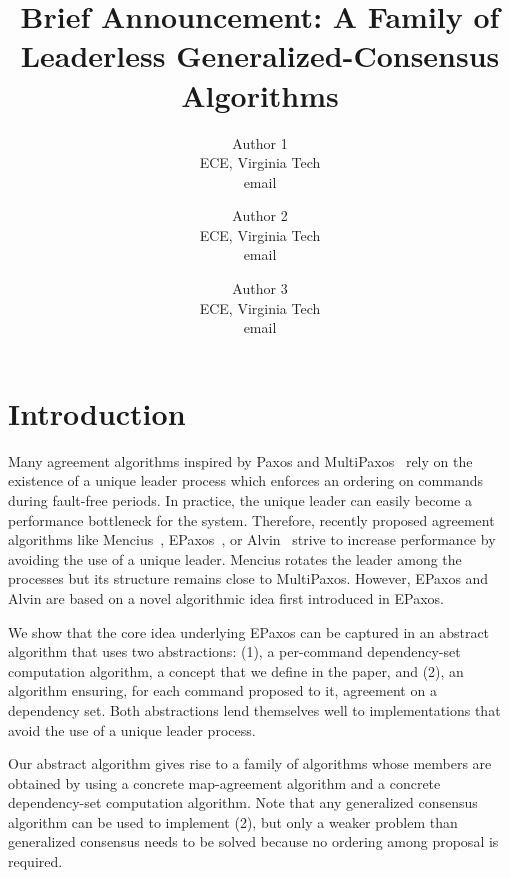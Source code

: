 

\title{\vspace{-0.8in}Brief Announcement: A Family of Leaderless Generalized-Consensus Algorithms}

\author{
Author 1\\
ECE, Virginia Tech\\
email
\and
Author 2\\
ECE, Virginia Tech\\
email
\and
Author 3\\
ECE, Virginia Tech\\
email
}

\date{}



\maketitle

%

\section{Introduction}

Many agreement algorithms inspired by Paxos and MultiPaxos~\cite{lamport2001paxos} rely on the existence of a unique leader process which enforces an ordering on commands during fault-free periods.
In practice, the unique leader can easily become a performance bottleneck for the system.
Therefore, recently proposed agreement algorithms like Mencius~\cite{MaoJunqueiraMarzullo08MenciusBuildingEfficientReplicatedStateMachine}, EPaxos~\cite{MoraruAndersenKaminsky13ThereIsMoreConsensusEgalitarianParliaments}, or Alvin~\cite{TurcuETAL14BeGeneralDontGiveUpConsistency} strive to increase performance by avoiding the use of a unique leader.
Mencius rotates the leader among the processes but its structure remains close to MultiPaxos. 
However, EPaxos and Alvin are based on a novel algorithmic idea first introduced in EPaxos.

We show that the core idea underlying EPaxos can be captured in an abstract algorithm that uses two abstractions: (1), a per-command dependency-set computation algorithm, a concept that we define in the paper, and (2), an algorithm ensuring, for each command proposed to it, agreement on a dependency set. Both abstractions lend themselves well to implementations that avoid the use of a unique leader process.

Our abstract algorithm gives rise to a family of algorithms whose members are obtained by using a concrete map-agreement algorithm and a concrete dependency-set computation algorithm. 
Note that any generalized consensus algorithm can be used to implement (2), but only a weaker problem than generalized consensus needs to be solved because no ordering among proposal is required.

